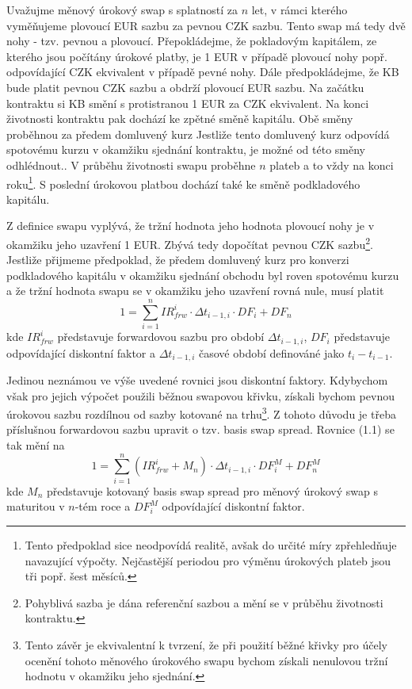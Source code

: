 \documentclass[a4paper]{book}
\begin{document}
Uvažujme měnový úrokový swap s splatností za $n$ let, v rámci kterého vyměňujeme plovoucí EUR sazbu za pevnou CZK sazbu. Tento swap má tedy dvě nohy - tzv. pevnou a plovoucí. Přepokládejme, že pokladovým kapitálem, ze kterého jsou počítány úrokové platby, je 1 EUR v případě plovoucí nohy popř. odpovídající CZK ekvivalent v případě pevné nohy. Dále předpokládejme, že KB bude platit pevnou CZK sazbu a obdrží plovoucí EUR sazbu. Na začátku kontraktu si KB smění s protistranou 1 EUR za CZK ekvivalent. Na konci životnosti kontraktu pak dochází ke zpětné směně kapitálu. Obě směny proběhnou za předem domluvený kurz {Jestliže tento domluvený kurz odpovídá spotovému kurzu v okamžiku sjednání kontraktu, je možné od této směny odhlédnout.}. V průběhu životnosti swapu proběhne $n$ plateb a to vždy na konci roku\footnote{Tento předpoklad sice neodpovídá realitě, avšak do určité míry zpřehledňuje navazující výpočty. Nejčastější periodou pro výměnu úrokových plateb jsou tři popř. šest měsíců.}. S poslední úrokovou platbou dochází také ke směně podkladového kapitálu.

Z definice swapu vyplývá, že tržní hodnota jeho hodnota plovoucí nohy je v okamžiku jeho uzavření 1 EUR. Zbývá tedy dopočítat pevnou CZK sazbu\footnote{Pohyblivá sazba je dána referenční sazbou a mění se v průběhu životnosti kontraktu.}. Jestliže přijmeme předpoklad, že předem domluvený kurz pro konverzi podkladového kapitálu v okamžiku sjednání obchodu byl roven spotovému kurzu a že tržní hodnota swapu se v okamžiku jeho uzavření rovná nule, musí platit
\begin{equation}
1 = \sum^n_{i=1}IR_{frw}^i \cdot \Delta t_{i-1,i} \cdot DF_i + DF_n
\end{equation}
kde $IR^i_{frw}$ představuje forwardovou sazbu pro období $\Delta t_{i-1,i}$, $DF_i$ představuje odpovídající diskontní faktor a $\Delta t_{i-1,i}$ časové období definováné jako $t_{i}-t_{i-1}$.

Jedinou neznámou ve výše uvedené rovnici jsou diskontní faktory. Kdybychom však pro jejich výpočet použili běžnou swapovou křivku, získali bychom pevnou úrokovou sazbu rozdílnou od sazby kotované na trhu\footnote{Tento závěr je ekvivalentní k tvrzení, že při použití běžné křivky pro účely ocenění tohoto měnového úrokového swapu bychom získali nenulovou tržní hodnotu v okamžiku jeho sjednání.}. Z tohoto důvodu je třeba příslušnou forwardovou sazbu upravit o tzv. basis swap spread. Rovnice (1.1) se tak mění na
\begin{equation*}
1 = \sum^n_{i=1}(IR_{frw}^i + M_n) \cdot \Delta t_{i-1,i} \cdot DF^M_i + DF^M_n
\end{equation*}
kde $M_n$ představuje kotovaný basis swap spread pro měnový úrokový swap s maturitou v $n$-tém roce a $DF^M_i$ odpovídající diskontní faktor.
\end{document}
